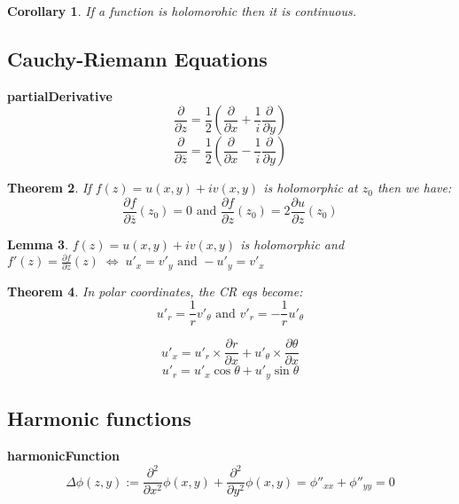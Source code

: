 \documentclass{article}
\newtheorem{theorem}{Theorem}[section]
\newtheorem{lemma}[theorem]{Lemma}
\newtheorem{corollary}[theorem]{Corollary}
\newenvironment{proof}[1][Proof]{\begin{trivlist}
\item[\hskip \labelsep {\bfseries #1}]}{\end{trivlist}}
\newenvironment{definition}[1][Definition]{\begin{trivlist}
\item[\hskip \labelsep {\bfseries #1}]}{\end{trivlist}}
\begin{document}
\begin{corollary}
    If a function is holomorohic then it is continuous.
\end{corollary}

\subsection*{Cauchy-Riemann Equations}
\begin{definition} \label{partialDerivative} \textbf{partialDerivative}
    $$\frac{\partial}{\partial z} = \frac{1}{2}\left(\frac{\partial}{\partial x} + \frac{1}{i}\frac{\partial}{\partial y}\right)$$
    $$\frac{\partial}{\partial \overline{z}} = \frac{1}{2}\left(\frac{\partial}{\partial x} - \frac{1}{i}\frac{\partial}{\partial y}\right)$$
\end{definition}

\begin{theorem}
    If $f(z) = u(x,y) + iv(x,y)$ is holomorphic at $z_0$ then we have:
    $$\frac{\partial f}{\partial \overline{z}}(z_0) = 0 \text{ and } \frac{\partial f}{\partial z}(z_0) = 2\frac{\partial u}{\partial z}(z_0) $$
\end{theorem}

\begin{lemma}
    $f(z) = u(x,y) + iv(x,y)$ is holomorphic and $f'(z)=\frac{\partial f}{\partial z}(z) \; \Leftrightarrow \; u'_x = v'_y \text{ and } -u'_y=v'_x$
\end{lemma}

\begin{theorem}
    In polar coordinates, the CR eqs become:
    \[ u'_r=\frac{1}{r}v'_\theta \text{ and } v'_r = - \frac{1}{r}u'_\theta\]
\end{theorem}

\begin{proof}
    \[u'_x=u'_r\times \frac{\partial r}{\partial x} + u'_\theta \times \frac{\partial \theta}{\partial x}\]
    \[u'_r=u'_x \cos{\theta} + u'_y \sin{\theta}\]
\end{proof}

\subsection*{Harmonic functions}
\begin{definition} \label{harmonicFunction} \textbf{harmonicFunction}
    $$\Delta\phi(z,y) := \frac{\partial^2}{\partial x^2}\phi(x,y) + \frac{\partial^2}{\partial y^2}\phi(x,y) = \phi''_{xx} + \phi''_{yy} = 0$$ 
\end{definition}
\end{document}
